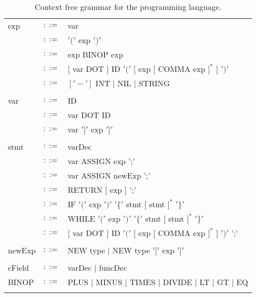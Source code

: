 \documentclass{article}
\begin{document}
\begin{table}[h]
\begin{tabular}{ l c l }
exp      & $::=$ & var                                                            \\
         & $::=$ & $'('$ exp $')'$                                                \\
         & $::=$ & exp BINOP exp                                                  \\
         & $::=$ & $[$ var DOT $]$ ID $'('$ $[$ exp $[$ COMMA exp $]^{*}$ $]$ $')'$ \\
         & $::=$ & $['-']$ INT $|$ NIL $|$ STRING                                 \\
\\
var      & $::=$ & ID                  \\
         & $::=$ & var DOT ID          \\
         & $::=$ & var $'['$ exp $']'$ \\
\\  
stmt     & $::=$ & varDec                                                             \\
         & $::=$ & var ASSIGN exp ';'                                                 \\
         & $::=$ & var ASSIGN newExp ';'                                              \\
         & $::=$ & RETURN $[$ exp $]$ ';'                                             \\
         & $::=$ & IF $'('$ exp $')'$ $'\{'$ stmt $[$ stmt $]^{*}$ $'\}'$             \\
         & $::=$ & WHILE $'('$ exp $')'$ $'\{'$ stmt $[$ stmt $]^{*}$ $'\}'$          \\
         & $::=$ & $[$ var DOT $]$ ID $'('$ $[$ exp $[$ COMMA exp $]^{*}$ $]$ $')'$ ';' \\
\\
newExp   & $::=$ & NEW type $|$ NEW type $'['$ exp $']'$ \\
\\
cField   & $::=$ & varDec $|$ funcDec \\
BINOP    & $::=$ & PLUS $|$ MINUS $|$ TIMES $|$ DIVIDE $|$ LT $|$ GT $|$ EQ \\
\\
\end{tabular}
\caption{
Context free grammar for the \plname programming language.
\label{Table_CFG}}
\end{table}
\end{document}

